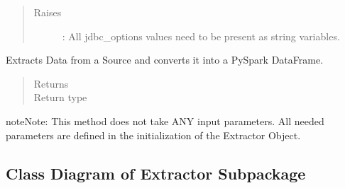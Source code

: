 \documentclass[a4paper,10pt, twoside,english]{sphinxmanual}
\begin{document}
\begin{fulllineitems}
\begin{quote}
\begin{description}
\begin{itemize}
\end{itemize}

\item[{Raises}] \leavevmode
{}: \textendash{} All jdbc\_options values need to be present as string variables.

\end{description}\end{quote}

\begin{fulllineitems}
\label{\detokenize{extractor/jdbc:spooq2.extractor.jdbc.JDBCExtractorIncremental.extract}}
Extracts Data from a Source and converts it into a PySpark DataFrame.
\begin{quote}\begin{description}
\item[{Returns}] \leavevmode


\item[{Return type}] \leavevmode
{}

\end{description}\end{quote}

\begin{sphinxadmonition}{note}{Note:}
This method does not take ANY input parameters. All needed parameters are defined
in the initialization of the Extractor Object.
\end{sphinxadmonition}

\end{fulllineitems}


\end{fulllineitems}



\subsection{Class Diagram of Extractor Subpackage}
\label{\detokenize{extractor/overview:class-diagram-of-extractor-subpackage}}
\noindent{}
\end{document}
